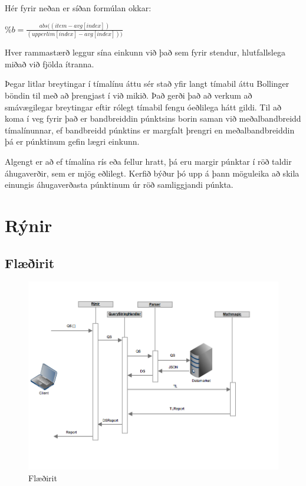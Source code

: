 \documentclass{article}
\begin{document}
Hér fyrir neðan er síðan formúlan okkar:


\begin{center}
  $\%b=\frac{abs((item - avg[index])}{(upperlim[index] - avg[index]))}$
\end{center}


Hver rammastærð leggur sína einkunn við það sem fyrir stendur, hlutfallslega
miðað við fjölda ítranna.

Þegar litlar breytingar í tímalínu áttu sér stað yfir langt tímabil áttu
Bollinger böndin til með að 
þrengjast í við mikið. Það gerði það að verkum að smávægilegar breytingar eftir
rólegt tímabil fengu
óeðlilega hátt gildi. Til að koma í veg fyrir það er bandbreiddin púnktsins
borin saman við meðalbandbreidd
tímalínunnar, ef bandbreidd púnktins er margfalt þrengri en meðalbandbreiddin þá
er púnktinum gefin lægri einkunn. 

Algengt er að ef tímalína rís eða fellur hratt, þá eru margir púnktar í röð
taldir áhugaverðir, sem er mjög eðlilegt.
Kerfið býður þó upp á þann möguleika að skila einungis áhugaverðasta púnktinum
úr röð samliggjandi púnkta.




\section{Rýnir}
\subsection{Flæðirit}
\label{sec:flow_chart}

\begin{figure}[H]
  \centering
  \includegraphics[width=.75\textwidth]{rynir_sequence-2.png} 
  \caption{Flæðirit} 
\end{figure}
\end{document}
